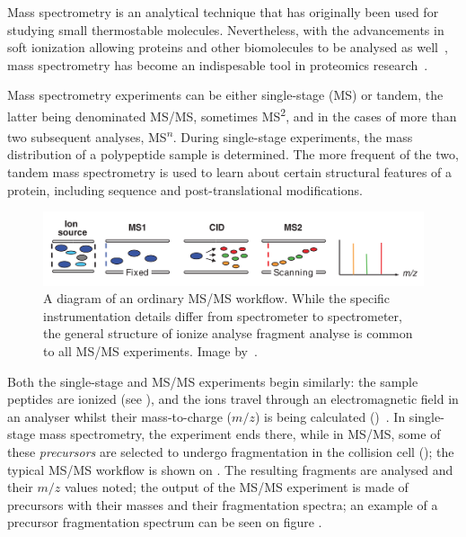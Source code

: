 Mass spectrometry is an analytical technique that has originally been used for studying small thermostable molecules. Nevertheless, with the advancements in soft ionization allowing proteins and other biomolecules to be analysed as well~\cite{fenn1989electrospray}, mass spectrometry has become an indispesable tool in proteomics research~\cite{collins2003human}.

Mass spectrometry experiments can be either single-stage (MS) or tandem, the latter being denominated MS/MS, sometimes MS\textsuperscript{2}, and in the cases of more than two subsequent analyses, MS\textsuperscript{\(n\)}. During single-stage experiments, the mass distribution of a polypeptide sample is determined. The more frequent of the two, tandem mass spectrometry is used to learn about certain structural features of a protein, including sequence and post-translational modifications.~\cite{domon2006mass}

\begin{figure}
  \centering
  \includegraphics[width=.9\linewidth]{img/msms-workflow.png}
  \caption{A diagram of an ordinary MS/MS workflow. While the specific instrumentation details differ from spectrometer to spectrometer, the general structure of ionize \textrightarrow{} analyse \textrightarrow{} fragment \textrightarrow{} analyse is common to all MS/MS experiments. Image by~\citet{domon2006mass}.}\label{fig:mass-spectrometry-workflow}
\end{figure}

Both the single-stage and MS/MS experiments begin similarly: the sample peptides are ionized (see ), and the ions travel through an electromagnetic field in an analyser whilst their mass-to-charge (\(m/z\)) is being calculated ()~\cite{gross2006mass}. In single-stage mass spectrometry, the experiment ends there, while in MS/MS, some of these \emph{precursors} are selected to undergo fragmentation in the collision cell (); the typical MS/MS workflow is shown on . The resulting fragments are analysed and their \(m/z\) values noted; the output of the MS/MS experiment is made of precursors with their masses and their fragmentation spectra; an example of a precursor fragmentation spectrum can be seen on figure .

